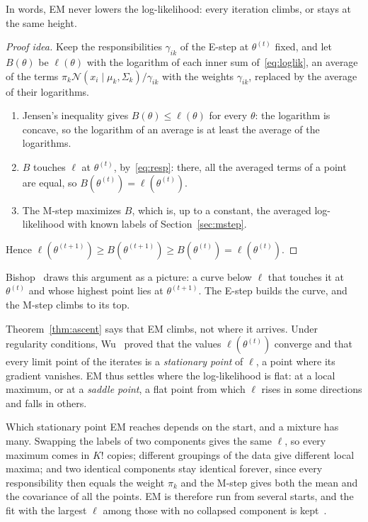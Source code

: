 \documentclass[11pt,a4paper]{amsart}
\numberwithin{equation}{section}
\theoremstyle{plain}
\theoremstyle{definition}
\theoremstyle{remark}
\newcommand{\N}{\mathcal{N}}
\newcommand{\given}{\mid}
\begin{document}
In words, EM never lowers the log-likelihood: every iteration climbs, or
stays at the same height.

\begin{proof}[Proof idea]
Keep the responsibilities $\gamma_{ik}$ of the E-step at $\theta^{(t)}$
fixed, and let $B(\theta)$ be $\ell(\theta)$ with the logarithm of each
inner sum of~\eqref{eq:loglik}, an average of the terms
$\pi_k \N(x_i \given \mu_k, \Sigma_k) / \gamma_{ik}$ with the weights
$\gamma_{ik}$, replaced by the average of their logarithms.
\begin{enumerate}[label=(\roman*), leftmargin=*, nosep]
\item Jensen's inequality gives $B(\theta) \leq \ell(\theta)$ for every
  $\theta$: the logarithm is concave, so the logarithm of an average is
  at least the average of the logarithms.
\item $B$ touches $\ell$ at $\theta^{(t)}$, by~\eqref{eq:resp}: there,
  all the averaged terms of a point are equal, so
  $B(\theta^{(t)}) = \ell(\theta^{(t)})$.
\item The M-step maximizes $B$, which is, up to a constant, the averaged
  log-likelihood with known labels of Section~\ref{sec:mstep}.
\end{enumerate}
Hence $\ell(\theta^{(t+1)}) \geq B(\theta^{(t+1)}) \geq B(\theta^{(t)})
= \ell(\theta^{(t)})$.
\end{proof}

Bishop~\cite{bishop2006} draws this argument as a picture: a curve below
$\ell$ that touches it at $\theta^{(t)}$ and whose highest point lies at
$\theta^{(t+1)}$. The E-step builds the curve, and the M-step climbs to
its top.

Theorem~\ref{thm:ascent} says that EM climbs, not where it arrives.
Under regularity conditions, Wu~\cite{wu1983} proved that the values
$\ell(\theta^{(t)})$ converge and that every limit point of the iterates
is a \emph{stationary point} of $\ell$, a point where its gradient
vanishes. EM thus settles where the log-likelihood is flat: at a local
maximum, or at a \emph{saddle point}, a flat point from which $\ell$
rises in some directions and falls in others.

Which stationary point EM reaches depends on the start, and a mixture
has many. Swapping the labels of two components gives the same $\ell$,
so every maximum comes in $K!$ copies; different groupings of the data
give different local maxima; and two identical components stay
identical forever, since every responsibility then equals the weight
$\pi_k$ and the M-step gives both the mean and the covariance of all
the points. EM is therefore run from several starts, and the fit with
the largest $\ell$ among those with no collapsed component is
kept~\cite{mclachlan2008}.
\end{document}

